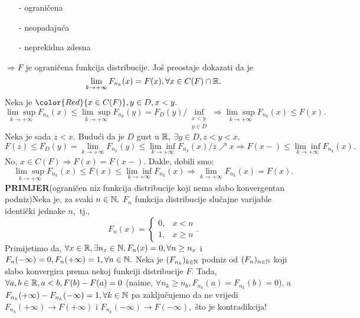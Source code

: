 \documentclass{article}
\begin{document}
\begin{itemize}
    \item[-] ograničena
    \item[-] neopadajuća
    \item[-] neprekidna zdesna
\end{itemize}
\(\Rightarrow F\) je ograničena funkcija distribucije. Još preostaje dokazati da je \[\lim\limits_{k\to+\infty}F_{n_k}(x)=F(x),\forall x\in C(F)\cap\Bbb R.\] Neka je \({\color{Red}{x\in C(F)}},y\in D,x<y.\) \[\underset{k\to+\infty}{\lim\sup}F_{n_k}(x)\le\underset{k\to+\infty}{\lim\sup}F_{n_k}(y)=F_D(y)/\inf_{\substack{x<y\\y\in D}}\Rightarrow \underset{k\to+\infty}{\lim\sup}F_{n_k}(x)\le F(x).\] Neka je sada \(z<x.\) Budući da je \(D\) gust u \(\Bbb R,\) \(\exists y\in D, z<y<x.\) \[F(z)\le F_D(y)=\lim_{k\to+\infty}F_{n_k}(y)\le\underset{k\to+\infty}{\lim\inf}F_{n_k}(x)/z\nearrow x\Rightarrow F(x-)\le\underset{k\to+\infty}{\lim\inf}F_{n_k}(x).\] No, \(x\in C(F)\Rightarrow F(x)=F(x-).\) Dakle, dobili smo: \[\underset{k\to+\infty}{\lim\sup}F_{n_k}(x)\le F(x)\le\underset{k\to+\infty}{\lim\inf}F_{n_k}(x)\Rightarrow\lim_{k\to+\infty}F_{n_k}(x)=F(x).\] 
\newline\newline
\textbf{PRIMJER}(ograničen niz funkcija distribucije koji nema slabo konvergentan podniz)\newline Neka je, za svaki \(n\in\Bbb N,\) \(F_n\) funkcija distribucije slučajne varijable identički jednake \(n,\) tj., \[F_n(x)=\begin{cases}0,&x<n\\1,&x\ge n\end{cases}.\] Primijetimo da, \(\forall x\in\Bbb R,\exists n_x\in\Bbb N,F_n(x)=0,\forall n\ge n_x\) i \(F_n(-\infty)=0,F_n(+\infty)=1,\forall n\in\Bbb N.\) Neka je \((F_{n_k})_{k\in\Bbb N}\) podniz od \((F_n)_{n\in\Bbb N}\) koji slabo konvergira prema nekoj funkciji distribucije \(F.\) Tada, \(\forall a,b\in\Bbb R,a<b, F(b)-F(a)=0\) (naime, \(\forall n_k\ge n_b, F_{n_k}(a)=F_{n_k}(b)=0\)), a \(F_{n_k}(+\infty)-F_{n_k}(-\infty)=1,\forall k\in\Bbb N\) pa zaključujemo da ne vrijedi \(F_{n_k}(+\infty)\to F(+\infty)\) i \(F_{n_k}(-\infty)\to F(-\infty),\)  što je kontradikcija!
\newline\newline
\end{document}
